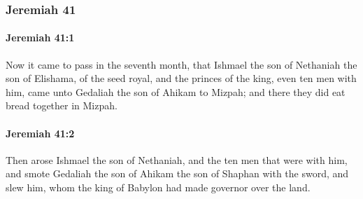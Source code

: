 	\subsubsection{Jeremiah 41} %
		\label{JEREMIAH-41}

		\paragraph{Jeremiah 41:1} %
			\label{JEREMIAH-41-1}

			Now it came to pass in the seventh month, that Ishmael the son of Nethaniah the son of Elishama, of the seed royal, and the princes of the king, even ten men with him, came unto Gedaliah the son of Ahikam to Mizpah; and there they did eat bread together in Mizpah.


		\paragraph{Jeremiah 41:2} %
			\label{JEREMIAH-41-2}

			Then arose Ishmael the son of Nethaniah, and the ten men that were with him, and smote Gedaliah the son of Ahikam the son of Shaphan with the sword, and slew him, whom the king of Babylon had made governor over the land.

